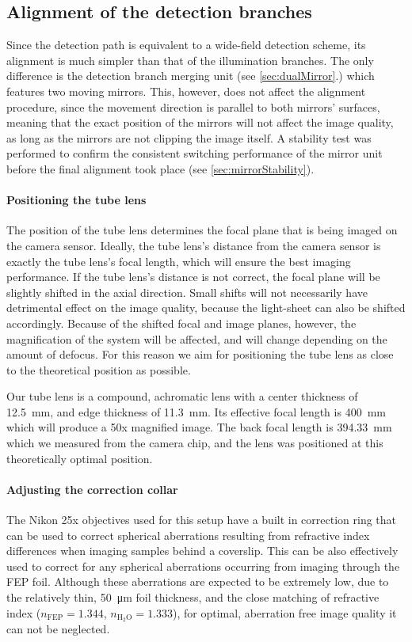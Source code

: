   \subsection{Alignment of the detection branches}
    Since the detection path is equivalent to a wide-field detection scheme, its alignment is much simpler than that of the illumination branches. The only difference is the detection branch merging unit (see \autoref{sec:dualMirror}.) which features two moving mirrors. This, however, does not affect the alignment procedure, since the movement direction is parallel to both mirrors' surfaces, meaning that the exact position of the mirrors will not affect the image quality, as long as the mirrors are not clipping the image itself. A stability test was performed to confirm the consistent switching performance of the mirror unit before the final alignment took place (see \autoref{sec:mirrorStability}).


    \paragraph{Positioning the tube lens}
      The position of the tube lens determines the focal plane that is being imaged on the camera sensor. Ideally, the tube lens's distance from the camera sensor is exactly the tube lens's focal length, which will ensure the best imaging performance. If the tube lens's distance is not correct, the focal plane will be slightly shifted in the axial direction. Small shifts will not necessarily have detrimental effect on the image quality, because the light-sheet can also be shifted accordingly. Because of the shifted focal and image planes, however, the magnification of the system will be affected, and will change depending on the amount of defocus. For this reason we aim for positioning the tube lens as close to the theoretical position as possible.

      Our tube lens is a compound, achromatic lens with a center thickness of \SI{12.5}{mm}, and edge thickness of \SI{11.3}{mm}. Its effective focal length is \SI{400}{mm} which will produce a 50x magnified image. The back focal length is \SI{394.33}{mm} which we measured from the camera chip, and the lens was positioned at this theoretically optimal position.

    \paragraph{Adjusting the correction collar}
      The Nikon 25x objectives used for this setup have a built in correction ring that can be used to correct spherical aberrations resulting from refractive index differences when imaging samples behind a coverslip. This can be also effectively used to correct for any spherical aberrations occurring from imaging through the FEP foil. Although these aberrations are expected to be extremely low, due to the relatively thin, \SI{50}{\micro m} foil thickness, and the close matching of refractive index ($n_{\mathrm{FEP}} = 1.344$, $n_{\mathrm{H_2O}}=1.333$), for optimal, aberration free image quality it can not be neglected.

